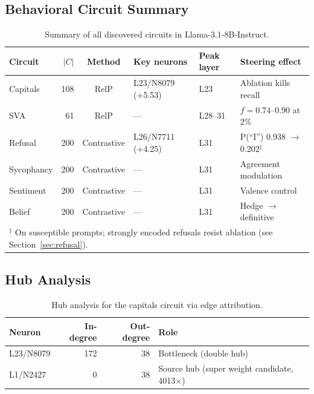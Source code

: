 \documentclass[11pt]{article}
\begin{document}
\subsection{Behavioral Circuit Summary}

\begin{table}[htbp]
\centering
\caption{Summary of all discovered circuits in Llama-3.1-8B-Instruct.}
\label{tab:all_circuits}
\small
\begin{tabular}{lrclll}
\toprule
\textbf{Circuit} & \textbf{$|C|$} & \textbf{Method} & \textbf{Key neurons} & \textbf{Peak layer} & \textbf{Steering effect} \\
\midrule
Capitals  & 108 & RelP        & L23/N8079 (+5.53) & L23 & Ablation kills recall \\
SVA       &  61 & RelP        & --- & L28--31 & $f{=}0.74$--$0.90$ at 2\% \\
Refusal   & 200 & Contrastive & L26/N7711 (+4.25) & L31 & P(``I'') 0.938 $\to$ 0.202$^\ddagger$ \\
Sycophancy& 200 & Contrastive & --- & L31 & Agreement modulation \\
Sentiment & 200 & Contrastive & --- & L31 & Valence control \\
Belief    & 200 & Contrastive & --- & L31 & Hedge $\to$ definitive \\
\bottomrule
\multicolumn{6}{l}{\footnotesize $^\ddagger$ On susceptible prompts; strongly encoded refusals resist ablation (see Section~\ref{sec:refusal}).}
\end{tabular}
\end{table}


\subsection{Hub Analysis}

\begin{table}[htbp]
\centering
\caption{Hub analysis for the capitals circuit via edge attribution.}
\label{tab:hubs}
\small
\begin{tabular}{lrrl}
\toprule
\textbf{Neuron} & \textbf{In-degree} & \textbf{Out-degree} & \textbf{Role} \\
\midrule
L23/N8079 & 172 & 38 & Bottleneck (double hub) \\
L1/N2427  & 0   & 38 & Source hub (super weight candidate, 4013$\times$) \\
\bottomrule
\end{tabular}
\end{table}
\end{document}
